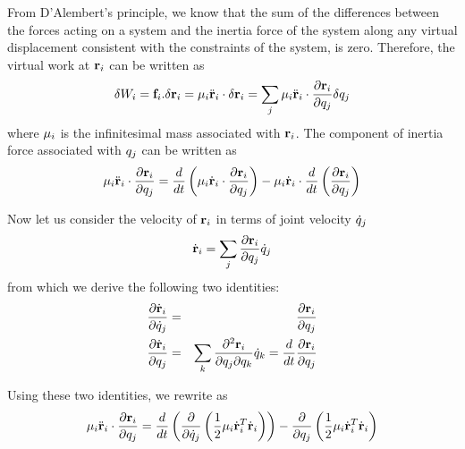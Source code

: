From D'Alembert's principle, we know that the sum of the differences
between the forces acting on a system and the inertia force of the
system along any virtual displacement consistent with the constraints
of the system, is zero. Therefore, the virtual work at $\mathbf{r}_i$ can be written as
\begin{equation}\label{eq:inertial_work}
  \delta W_i = \mathbf{f}_{i} . \delta \mathbf{r}_i = \mathbf{\mu}_i \ddot{\mathbf{r}}_i \cdot
    \delta \mathbf{r}_i = \sum_j \mathbf{\mu}_i \ddot{\mathbf{r}}_i \cdot
    \frac{\partial \mathbf{r}_i}{\partial q_j} \delta q_j
\end{equation}
where $\mathbf{\mu}_i$ is the infinitesimal mass associated with
$\mathbf{r}_i$. The component of inertia force associated with
$q_j$ can be written as
\begin{equation}
\label{eq:inertia_force}
  \mathbf{\mu}_i \ddot{\mathbf{r}}_i \cdot \frac{\partial \mathbf{r}_i}{\partial q_j} =
  \frac{d}{dt} \left( \mathbf{\mu}_i \dot{\mathbf{r}}_i \cdot \frac{\partial
  \mathbf{r}_i}{\partial q_j} \right) - \mathbf{\mu}_i
\dot{\mathbf{r}}_i \cdot \frac{d}{dt} \left( \frac{\partial
    \mathbf{r}_i}{\partial q_j} \right) 
\end{equation}

Now let us consider the velocity of $\mathbf{r}_i$ in terms of
joint velocity $\dot{q}_j$
\begin{equation}
\label{eq:velocity}
\dot{\mathbf{r}}_i = \sum_j \frac{\partial
  \mathbf{r}_i}{\partial q_j} \dot{q}_j
\end{equation}
from which we derive the following two identities:
\begin{eqnarray}
\frac{\partial \dot{\mathbf{r}}_i}{\partial \dot{q}_j} &=&
\frac{\partial \mathbf{r}_i}{\partial q_j}  \\
\frac{\partial \dot{\mathbf{r}}_i}{\partial q_j} &=&
\sum_k \frac{\partial^2 \mathbf{r}_i}{\partial q_j \partial
  q_k} \dot{q}_k = \frac{d}{dt} \frac{\partial \mathbf{r}_i}{\partial q_j}
\end{eqnarray}

Using these two identities, we rewrite  as
\begin{equation}
\label{eq:inertia_force2}
\mathbf{\mu}_i \ddot{\mathbf{r}}_i \cdot \frac{\partial \mathbf{r}_i}{\partial q_j}   = \frac{d}{dt} \left ( \frac{\partial}{\partial \dot{q}_j} \left( \frac{1}{2} \mathbf{\mu}_i \dot{\mathbf{r}}_i^{T} \dot{\mathbf{r}}_i\right) \right)
   - \frac{\partial}{\partial q_j} \left( \frac{1}{2} \mathbf{\mu}_i \dot{\mathbf{r}}_i^{T} \dot{\mathbf{r}}_i \right)
\end{equation}

